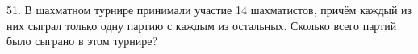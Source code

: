 51. В шахматном турнире принимали участие 14 шахматистов, причём каждый из них сыграл только одну партию с каждым из остальных. Сколько всего партий было сыграно в этом турнире?\\
